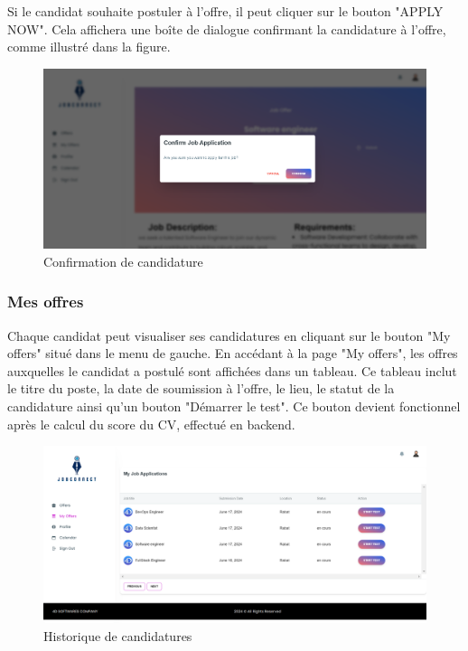 Si le candidat souhaite postuler à l'offre, il peut cliquer sur le  bouton "APPLY NOW". Cela affichera une boîte de dialogue confirmant la candidature à l'offre, comme illustré dans la figure.
\newline

\begin{figure}[htbp]
   \centering
   \includegraphics[scale=0.2]{screens/confirmJob2.png} 
   \caption{Confirmation de candidature}
   \label{fig:listOffers}
\end{figure}

\subsubsection{Mes offres}
Chaque candidat peut visualiser ses candidatures en cliquant sur le bouton "My offers" situé dans le  menu de  gauche. En accédant à la page "My offers", les  offres auxquelles le  candidat a postulé sont affichées dans un tableau. Ce  tableau inclut le titre du poste, la date de  soumission à l'offre, le  lieu, le  statut de la candidature ainsi qu'un bouton "Démarrer le test". 
Ce  bouton devient fonctionnel après le calcul du score du CV, effectué en backend.  
\begin{figure}[htbp]
   \centering
   \includegraphics[scale=0.2]{screens/myofffers.png} 
   \caption{Historique de candidatures}
   \label{fig:listOffers}
\end{figure}

